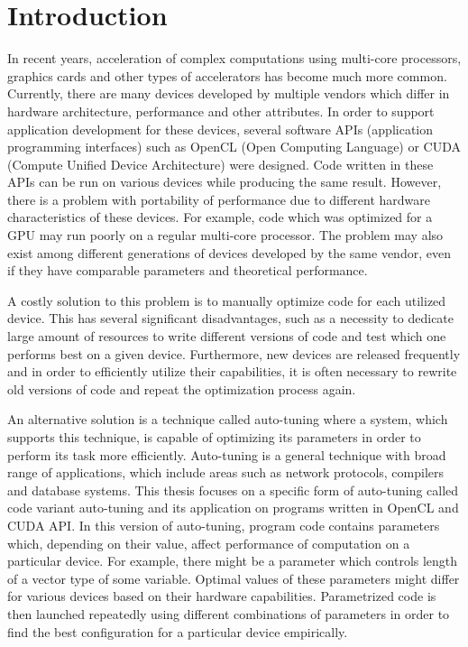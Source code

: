 \documentclass
[
    digital, %
    oneside, %
    table, %
    nolof, %
    nolot, %
    nocover %
]{fithesis3}
\begin{document}
\chapter{Introduction}
In recent years, acceleration of complex computations using multi-core processors, graphics cards and other types of accelerators has become
much more common. Currently, there are many devices developed by multiple vendors which differ in hardware architecture, performance and other
attributes. In order to support application development for these devices, several software APIs (application programming interfaces) such as
OpenCL (Open Computing Language) or CUDA (Compute Unified Device Architecture) were designed. Code written in these APIs can be run on various
devices while producing the same result. However, there is a problem with portability of performance due to different hardware characteristics of
these devices. For example, code which was optimized for a GPU may run poorly on a regular multi-core processor. The problem may also exist among
different generations of devices developed by the same vendor, even if they have comparable parameters and theoretical performance.

A costly solution to this problem is to manually optimize code for each utilized device. This has several significant disadvantages, such as
a necessity to dedicate large amount of resources to write different versions of code and test which one performs best on a given device. Furthermore,
new devices are released frequently and in order to efficiently utilize their capabilities, it is often necessary to rewrite old versions of code and
repeat the optimization process again.

An alternative solution is a technique called auto-tuning where a system, which supports this technique, is capable of optimizing its parameters
in order to perform its task more efficiently. Auto-tuning is a general technique with broad range of applications, which include areas such as network
protocols, compilers and database systems. This thesis focuses on a specific form of auto-tuning called code variant auto-tuning and its application on
programs written in OpenCL and CUDA API. In this version of auto-tuning, program code contains parameters which, depending on their value, affect
performance of computation on a particular device. For example, there might be a parameter which controls length of a vector type of some variable.
Optimal values of these parameters might differ for various devices based on their hardware capabilities. Parametrized code is then launched repeatedly
using different combinations of parameters in order to find the best configuration for a particular device empirically.
\end{document}
